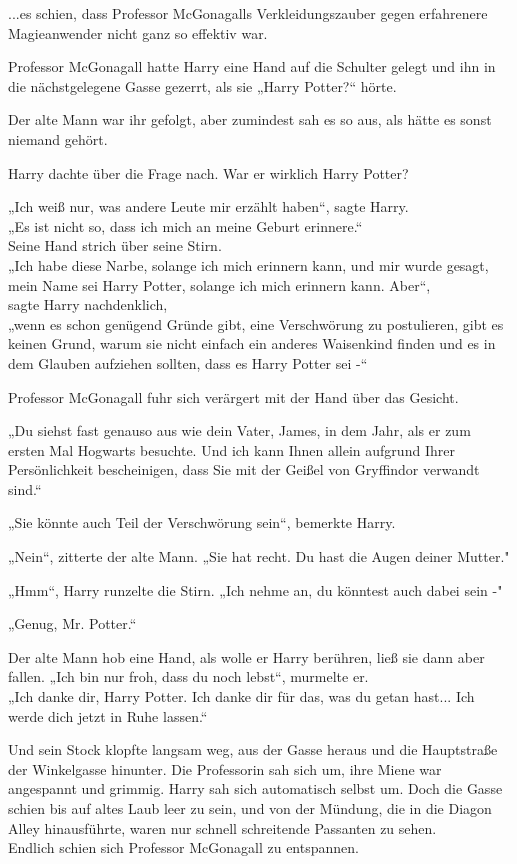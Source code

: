 {...es schien, dass Professor McGonagalls Verkleidungszauber gegen erfahrenere Magieanwender nicht ganz so effektiv war.

Professor McGonagall hatte Harry eine Hand auf die Schulter gelegt und ihn in die nächstgelegene Gasse gezerrt, als sie „Harry Potter?“ hörte.

Der alte Mann war ihr gefolgt, aber zumindest sah es so aus, als hätte es sonst niemand gehört.

Harry dachte über die Frage nach. War er wirklich Harry Potter?

„Ich weiß nur, was andere Leute mir erzählt haben“, sagte Harry.\\ „Es ist nicht so, dass ich mich an meine Geburt erinnere.“\\ Seine Hand strich über seine Stirn.\\ „Ich habe diese Narbe, solange ich mich erinnern kann, und mir wurde gesagt, mein Name sei Harry Potter, solange ich mich erinnern kann. Aber“,\\ sagte Harry nachdenklich,\\ „wenn es schon genügend Gründe gibt, eine Verschwörung zu postulieren, gibt es keinen Grund, warum sie nicht einfach ein anderes Waisenkind finden und es in dem Glauben aufziehen sollten, dass es Harry Potter sei -“

Professor McGonagall fuhr sich verärgert mit der Hand über das Gesicht.

„Du siehst fast genauso aus wie dein Vater, James, in dem Jahr, als er zum ersten Mal Hogwarts besuchte. Und ich kann Ihnen allein aufgrund Ihrer Persönlichkeit bescheinigen, dass Sie mit der Geißel von Gryffindor verwandt sind.“

„Sie könnte auch Teil der Verschwörung sein“, bemerkte Harry.

„Nein“, zitterte der alte Mann. „Sie hat recht. Du hast die Augen deiner Mutter."

„Hmm“, Harry runzelte die Stirn. „Ich nehme an, du könntest auch dabei sein -"

„Genug, Mr. Potter.“

Der alte Mann hob eine Hand, als wolle er Harry berühren, ließ sie dann aber fallen. „Ich bin nur froh, dass du noch lebst“, murmelte er.\\ „Ich danke dir, Harry Potter. Ich danke dir für das, was du getan hast... Ich werde dich jetzt in Ruhe lassen.“

Und sein Stock klopfte langsam weg, aus der Gasse heraus und die Hauptstraße der Winkelgasse hinunter. Die Professorin sah sich um, ihre Miene war angespannt und grimmig. Harry sah sich automatisch selbst um. Doch die Gasse schien bis auf altes Laub leer zu sein, und von der Mündung, die in die Diagon Alley hinausführte, waren nur schnell schreitende Passanten zu sehen.\\ Endlich schien sich Professor McGonagall zu entspannen.

}
